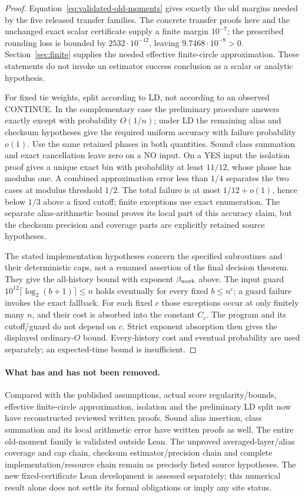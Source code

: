 \documentclass[11pt]{article}
\begin{document}
\begin{proof}
Equation~\eqref{eq:validated-old-moments} gives exactly the old margins
needed by the five released transfer families. The concrete transfer
proofs here and the unchanged exact scalar certificate supply a finite
margin $10^{-7}$; the prescribed rounding loss is bounded by
$2532\cdot10^{-12}$, leaving $9.7468\cdot10^{-8}>0$.
Section~\ref{sec:finite} supplies the needed effective finite-circle
approximation. These statements do not invoke an estimator success
conclusion as a scalar or analytic hypothesis.

For fixed tie weights, split according to LD, not according to an
observed CONTINUE. In the complementary case the preliminary procedure
answers exactly except with probability $O(1/n)$; under LD the
remaining alias and checksum hypotheses give the required uniform
accuracy with failure probability $o(1)$. Use the same retained phases
in both quantities. Sound class summation and exact cancellation leave
zero on a NO input. On a YES input the isolation proof gives a unique
exact bin with probability at least $11/12$, whose phase has modulus
one. A combined approximation error less than $1/4$ separates the two
cases at modulus threshold $1/2$. The total failure is at most
$1/12+o(1)$, hence below $1/3$ above a fixed cutoff; finite exceptions
use exact enumeration. The separate alias-arithmetic bound proves its
local part of this accuracy claim, but the checksum precision and
coverage parts are explicitly retained source hypotheses.

The stated implementation hypotheses concern the specified subroutines
and their deterministic caps, not a renamed assertion of the final
decision theorem. They give the all-history bound with exponent
$\beta_{\rm work}$ above. The input guard
$10^{12}\lceil\log_2(b+1)\rceil\le n$ holds eventually for every
fixed $b\le n^c$; a guard failure invokes the exact fallback.
For each fixed $c$ those exceptions occur at only finitely many $n$,
and their cost is absorbed into the constant $C_c$. The program and
its cutoff/guard do not depend on $c$. Strict exponent absorption then
gives the displayed ordinary-$O$ bound. Every-history cost and eventual
probability are used separately; an expected-time bound is insufficient.
\end{proof}

\paragraph{What has and has not been removed.}
Compared with the published assumptions, actual score regularity/bounds,
effective finite-circle approximation, isolation and the preliminary
LD split now have reconstructed reviewed written proofs. Sound alias
insertion, class summation and its local arithmetic error have written
proofs as well. The entire old-moment family is validated outside Lean.
The unproved averaged-layer/alias coverage and cap chain, checksum
estimator/precision chain and complete implementation/resource chain
remain as precisely listed source hypotheses. The new fixed-certificate
Lean development is assessed separately; this numerical result alone
does not settle its formal obligations or imply any site status.
\end{document}

